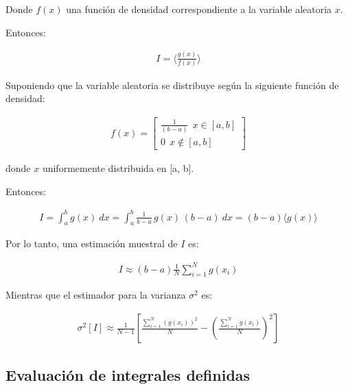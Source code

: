 Donde $f(x)$ una funci\'on de densidad correspondiente a la variable aleatoria $x$.
%

Entonces:

\begin{eqnarray}
 	I = \langle \frac{g(x)}{f(x)} \rangle
 \label{EqZZZ16} 
\end{eqnarray}

Suponiendo que la variable aleatoria se distribuye seg\'un la siguiente funci\'on de densidad:

\begin{eqnarray}
 	f(x) =  \left[  \begin{array}{c} 
               \frac{1}{(b -a)} \: \: x \in [a, b]  \\ 
 	       0 \: \: x \notin [a, b]  \end{array} \right] \nonumber
 \label{EqZZZ17} 
\end{eqnarray}


donde $x$ uniformemente distribuida en [a, b].

Entonces:

\begin{eqnarray}
 	I =  \int _{a} ^{b} g(x) \: d x = \int _{a} ^{b} \frac{1}{b -a} \, g(x) \, (b -a) \: d x =  (b - a) \langle g(x) \rangle
 \label{EqZZZ18} 
\end{eqnarray}

Por lo tanto, una estimaci\'on muestral de $I$ es:

\begin{eqnarray}
 	I \approx (b - a) \frac{1}{N} \sum _{i=1} ^{N} g(x_{i})
 \label{EqZZZ19} 
\end{eqnarray}


Mientras que el estimador para la varianza $\sigma ^{2}$ es:

\begin{eqnarray}
 	\sigma ^{2} [I] \approx \frac{1}{N - 1} \left[ \frac{\sum_{i=1} ^{N} (g(x_{i}))^{2}} {N} 
 	                                               - \left(\frac{\sum_{i=1} ^{N} g(x_{i})} {N}\right) ^{2} \right]
 \label{EqZZZ20} 
\end{eqnarray}


\subsection{Evaluaci\'on de integrales definidas}
\label{CapVII_7}


